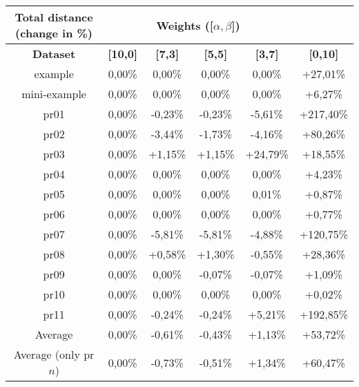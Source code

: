 {
\renewcommand{\arraystretch}{2}
\begin{longtable}[h]{| c | c | c | c | c | c |}
    \hline
    \textbf{Total distance (change in \%)} & \multicolumn{4}{c}{\textbf{Weights ([$\alpha,\beta$])}} & \\
    \hline
    \textbf{Dataset} & \textbf{[10,0]} & \textbf{[7,3]} & \textbf{[5,5]} & \textbf{[3,7]} & \textbf{[0,10]} \\
    \hline
    \endhead
    example              & 0,00\% &  0,00\% &  0,00\% &   0,00\% &  +27,01\% \\
    \hline
    mini-example         & 0,00\% &  0,00\% &  0,00\% &   0,00\% &   +6,27\% \\
    \hline
    pr01                 & 0,00\% & -0,23\% & -0,23\% &  -5,61\% & +217,40\% \\
    \hline
    pr02                 & 0,00\% & -3,44\% & -1,73\% &  -4,16\% &  +80,26\% \\
    \hline
    pr03                 & 0,00\% & +1,15\% & +1,15\% & +24,79\% &  +18,55\% \\
    \hline
    pr04                 & 0,00\% &  0,00\% &  0,00\% &   0,00\% &   +4,23\% \\
    \hline
    pr05                 & 0,00\% &  0,00\% &  0,00\% &   0,01\% &   +0,87\% \\
    \hline
    pr06                 & 0,00\% &  0,00\% &  0,00\% &   0,00\% &   +0,77\% \\
    \hline
    pr07                 & 0,00\% & -5,81\% & -5,81\% &  -4,88\% & +120,75\% \\
    \hline
    pr08                 & 0,00\% & +0,58\% & +1,30\% &  -0,55\% &  +28,36\% \\
    \hline
    pr09                 & 0,00\% &  0,00\% & -0,07\% &  -0,07\% &   +1,09\% \\
    \hline
    pr10                 & 0,00\% &  0,00\% &  0,00\% &   0,00\% &   +0,02\% \\
    \hline
    pr11                 & 0,00\% & -0,24\% & -0,24\% &  +5,21\% & +192,85\% \\
    \hline
    Average              & 0,00\% & -0,61\% & -0,43\% &  +1,13\% &  +53,72\% \\
    \hline
    Average (only pr$n$) & 0,00\% & -0,73\% & -0,51\% &  +1,34\% &  +60,47\% \\
    \hline
\end{longtable}
}


